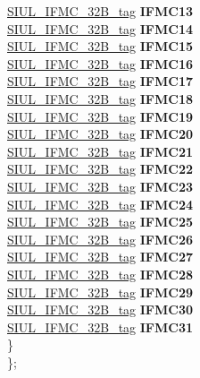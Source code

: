 \begin{DoxyCompactItemize}
\begin{tabbing}
\>\>\mbox{\hyperlink{unionSIUL__IFMC__32B__tag}{SIUL\_IFMC\_32B\_tag}} {\bfseries IFMC13}\\
\>\>\mbox{\hyperlink{unionSIUL__IFMC__32B__tag}{SIUL\_IFMC\_32B\_tag}} {\bfseries IFMC14}\\
\>\>\mbox{\hyperlink{unionSIUL__IFMC__32B__tag}{SIUL\_IFMC\_32B\_tag}} {\bfseries IFMC15}\\
\>\>\mbox{\hyperlink{unionSIUL__IFMC__32B__tag}{SIUL\_IFMC\_32B\_tag}} {\bfseries IFMC16}\\
\>\>\mbox{\hyperlink{unionSIUL__IFMC__32B__tag}{SIUL\_IFMC\_32B\_tag}} {\bfseries IFMC17}\\
\>\>\mbox{\hyperlink{unionSIUL__IFMC__32B__tag}{SIUL\_IFMC\_32B\_tag}} {\bfseries IFMC18}\\
\>\>\mbox{\hyperlink{unionSIUL__IFMC__32B__tag}{SIUL\_IFMC\_32B\_tag}} {\bfseries IFMC19}\\
\>\>\mbox{\hyperlink{unionSIUL__IFMC__32B__tag}{SIUL\_IFMC\_32B\_tag}} {\bfseries IFMC20}\\
\>\>\mbox{\hyperlink{unionSIUL__IFMC__32B__tag}{SIUL\_IFMC\_32B\_tag}} {\bfseries IFMC21}\\
\>\>\mbox{\hyperlink{unionSIUL__IFMC__32B__tag}{SIUL\_IFMC\_32B\_tag}} {\bfseries IFMC22}\\
\>\>\mbox{\hyperlink{unionSIUL__IFMC__32B__tag}{SIUL\_IFMC\_32B\_tag}} {\bfseries IFMC23}\\
\>\>\mbox{\hyperlink{unionSIUL__IFMC__32B__tag}{SIUL\_IFMC\_32B\_tag}} {\bfseries IFMC24}\\
\>\>\mbox{\hyperlink{unionSIUL__IFMC__32B__tag}{SIUL\_IFMC\_32B\_tag}} {\bfseries IFMC25}\\
\>\>\mbox{\hyperlink{unionSIUL__IFMC__32B__tag}{SIUL\_IFMC\_32B\_tag}} {\bfseries IFMC26}\\
\>\>\mbox{\hyperlink{unionSIUL__IFMC__32B__tag}{SIUL\_IFMC\_32B\_tag}} {\bfseries IFMC27}\\
\>\>\mbox{\hyperlink{unionSIUL__IFMC__32B__tag}{SIUL\_IFMC\_32B\_tag}} {\bfseries IFMC28}\\
\>\>\mbox{\hyperlink{unionSIUL__IFMC__32B__tag}{SIUL\_IFMC\_32B\_tag}} {\bfseries IFMC29}\\
\>\>\mbox{\hyperlink{unionSIUL__IFMC__32B__tag}{SIUL\_IFMC\_32B\_tag}} {\bfseries IFMC30}\\
\>\>\mbox{\hyperlink{unionSIUL__IFMC__32B__tag}{SIUL\_IFMC\_32B\_tag}} {\bfseries IFMC31}\\
\>\} \\
\}; \\


\end{tabbing}
\end{DoxyCompactItemize}
